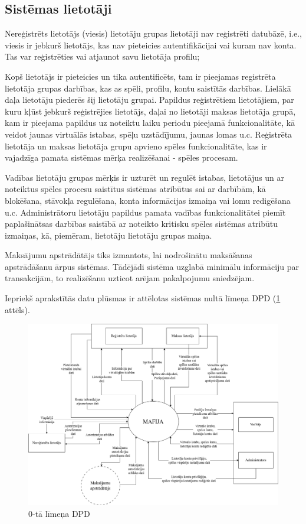 \subsection{Sistēmas lietotāji}
Nereģistrēts lietotājs (viesis) lietotāju grupas lietotāji nav reģistrēti datubāzē, i.e., viesis ir jebkurš lietotājs, kas nav pieteicies autentifikācijai vai kuram nav konta.
Tas var reģistrēties vai atjaunot savu lietotāja profilu;

Kopš lietotājs ir pieteicies un tika autentificēts, tam ir pieejamas registrēta lietotāja grupas darbības, kas as spēli, profilu, kontu saistītās darbības.
Lielākā daļa lietotāju piederēs šij lietotāju grupai.
Papildus reģistrētiem lietotājiem, par kuru kļūst jebkurš reģistrējies lietotājs, daļai no lietotāji maksas lietotāja grupā, kam ir pieejama papildus uz noteiktu laiku periodu pieejamā funkcionalitāte, kā veidot jaunas virtuālās istabas, spēļu uzstādījumu, jaunas lomas u.c.
Reģistrēta lietotāja un maksas lietotāja grupu apvieno spēles funkcionalitāte, kas ir vajadzīga pamata sistēmas mērķa realizēšanai - spēles procesam.

Vadības lietotāju grupas mērķis ir uzturēt un regulēt istabas, lietotājus un ar noteiktus spēles procesu saistītus sistēmas atribūtus sai ar darbībām, kā blokēšana, stāvokļa regulēšana, konta informācijas izmaiņa vai lomu redigēšana u.c.
Administrātoru lietotāju papildus pamata vadības funkcionalitātei piemīt paplašinātsas darbības saistībā ar noteikto kritisku spēles sistēmas atribūtu izmaiņas, kā, piemēram, lietotāju lietotāju grupas maiņa.

Maksājumu apstrādātājs tiks izmantots, lai nodrošinātu maksāšanas apstrādāšanu ārpus sistēmas. Tādējādi sistēma uzglabā minimālu informāciju par transakcijām, to realizēšanu uzticot arējam pakalpojumu sniedzējam.

Iepriekš aprakstītās datu plūsmas ir attēlotas sistēmas nultā līmeņa DPD (\ref{fig:dpd_0} attēls).

\begin{figure}[h]
	\centering
	\includegraphics[width=\linewidth]{./src/description/img/DPD_0.png}
	\caption{0-tā līmeņa DPD}
	\label{fig:dpd_0}
\end{figure}
